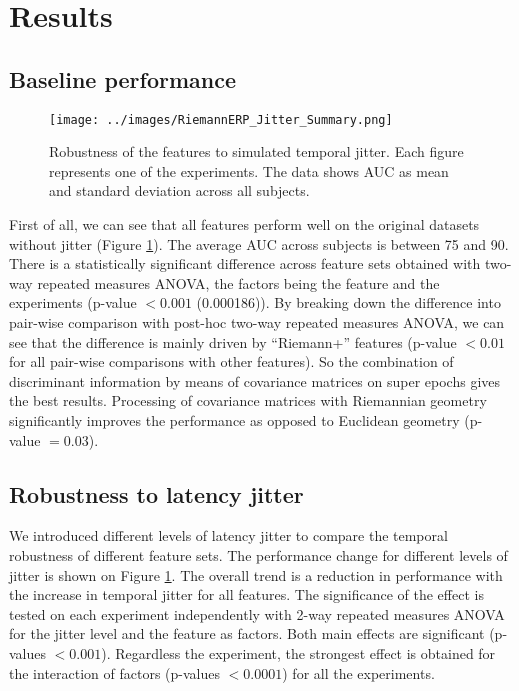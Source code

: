 \documentclass[12pt]{iopart}
\begin{document}
\section{Results}
\label{sec:results}

\subsection{Baseline performance}

\begin{figure}[!t]
    \centering
    \texttt{[image: ../images/RiemannERP\_Jitter\_Summary.png]}
\caption{Robustness of the features to simulated temporal jitter.
    Each figure represents one of the experiments. The data shows
    AUC as mean and standard deviation across all subjects.}
\label{fig:jitter}
\end{figure}

First of all, we can see that all features perform well on the
original datasets without jitter (Figure \ref{fig:jitter}). The average AUC across subjects is between 75 and 90.
There is a statistically significant difference across feature sets obtained with two-way repeated
measures ANOVA, the factors being the feature and the experiments (p-value $< 0.001$
(0.000186)). By breaking down the difference into pair-wise comparison with post-hoc
two-way repeated measures ANOVA, we can see that the difference is mainly driven by
``Riemann+'' features (p-value $< 0.01$ for all pair-wise comparisons with other
features). So the combination of discriminant information by means
of covariance matrices on super epochs gives the best results. Processing of
covariance matrices with Riemannian geometry significantly improves the performance
as opposed to Euclidean geometry (p-value $= 0.03$).


\subsection{Robustness to latency jitter}

We introduced different levels of latency jitter to compare the temporal robustness
of different feature sets.
The performance change for different levels of jitter is shown on Figure \ref{fig:jitter}.
The overall trend is a reduction in performance with the increase in temporal jitter for all features.
The significance of the effect is tested on each experiment independently
with 2-way repeated measures ANOVA for the jitter level and the feature
as factors. Both main effects are significant (p-values $<0.001$). 
Regardless the experiment, the strongest effect is obtained for the interaction
of factors (p-values $< 0.0001$) for all the experiments.
\end{document}
